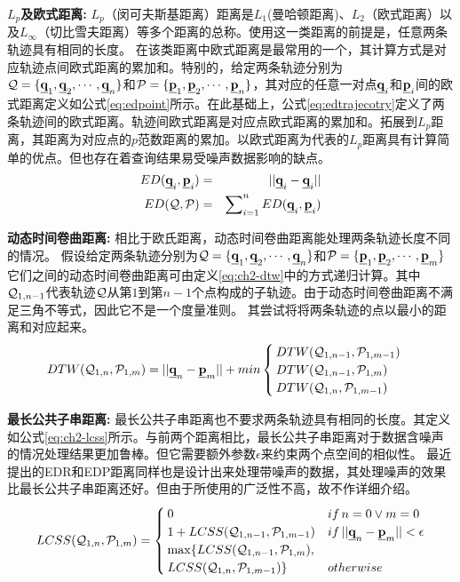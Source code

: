 \textbf{$L_{p}$及欧式距离:}
$L_{p}$（闵可夫斯基距离）距离是$L_1$(曼哈顿距离)、$L_2$（欧式距离）以及$L_\infty$（切比雪夫距离）等多个距离的总称。使用这一类距离的前提是，任意两条轨迹具有相同的长度。
在该类距离中欧式距离是最常用的一个，其计算方式是对应轨迹点间欧式距离的累加和。特别的，给定两条轨迹分别为${\cal{Q}}=\{\emph{{\textbf{q}}}_{1},\emph{{\textbf{q}}}_{2},\cdots,\emph{{\textbf{q}}}_{n}\}$和${\cal{P}}=\{\emph{{\textbf{p}}}_1,\emph{{\textbf{p}}}_{2},\cdots,\emph{{\textbf{p}}}_{n}\}$，其对应的任意一对点$\emph{{\textbf{q}}}_{i}$和$\emph{{\textbf{p}}}_{i}$间的欧式距离定义如公式\ref{eq:edpoint}所示。在此基础上，公式\ref{eq:edtrajecotry}定义了两条轨迹间的欧式距离。轨迹间欧式距离是对应点欧式距离的累加和。拓展到$L_{p}$距离，其距离为对应点的$p$范数距离的累加。以欧式距离为代表的$L_{p}$距离具有计算简单的优点。但也存在着查询结果易受噪声数据影响的缺点。
\begin{eqnarray}
ED(\emph{{\textbf{q}}}_{i},\emph{{\textbf{p}}}_{i})&=&||\emph{{\textbf{q}}}_{i} - \emph{{\textbf{q}}}_{i}|| \\ \label{eq:edpoint}
ED({\cal{Q}}, {\cal{P}})&=&\sum\nolimits_{i=1}^{n}ED(\emph{{\textbf{q}}}_{i},\emph{{\textbf{p}}}_{i}) \label{eq:edtrajecotry}
\end{eqnarray}


\textbf{动态时间卷曲距离:}
相比于欧氏距离，动态时间卷曲距离能处理两条轨迹长度不同的情况。
假设给定两条轨迹分别为${\cal{Q}}=\{\emph{{\textbf{q}}}_{1},\emph{{\textbf{q}}}_{2},\cdots,\emph{{\textbf{q}}}_{n}\}$和${\cal{P}}=\{\emph{{\textbf{p}}}_1,\emph{{\textbf{p}}}_{2},\cdots,\emph{{\textbf{p}}}_{m}\}$
它们之间的动态时间卷曲距离可由定义\ref{eq:ch2-dtw}中的方式递归计算。其中${\cal{Q}}_{1,n-1}$代表轨迹$\cal Q$从第$1$到第$n-1$个点构成的子轨迹。由于动态时间卷曲距离不满足三角不等式，因此它不是一个度量准则。
其尝试将将两条轨迹的点以最小的距离和对应起来。
\begin{equation}\label{eq:ch2-dtw}
DTW({\cal{Q}}_{1,n}, {\cal{P}}_{1,m})=||\emph{{\textbf{q}}}_{n}-\emph{{\textbf{p}}}_{m}||+min \begin{cases}
DTW({\cal{Q}}_{1,n-1}, {\cal{P}}_{1,m-1})  \\
DTW({\cal{Q}}_{1,n-1}, {\cal{P}}_{1,m})  \\
DTW({\cal{Q}}_{1,n}, {\cal{P}}_{1,m-1})
\end{cases}
\end{equation}


\textbf{最长公共子串距离:}
最长公共子串距离也不要求两条轨迹具有相同的长度。其定义如公式\ref{eq:ch2-lcss}所示。与前两个距离相比，最长公共子串距离对于数据含噪声的情况处理结果更加鲁棒。但它需要额外参数$\epsilon$来约束两个点空间的相似性。
最近提出的EDR和EDP距离同样也是设计出来处理带噪声的数据，其处理噪声的效果比最长公共子串距离还好。但由于所使用的广泛性不高，故不作详细介绍。
\begin{eqnarray}\label{eq:ch2-lcss}
LCSS({\cal{Q}}_{1,n}, {\cal{P}}_{1,m})= \begin{cases}
0 & if \, n=0 \lor m=0  \\
1+ LCSS({\cal{Q}}_{1,n-1}, {\cal{P}}_{1,m-1}) & if \,  ||\emph{{\textbf{q}}}_{n}-\emph{{\textbf{p}}}_{m}||<\epsilon  \\
\max \{LCSS({\cal{Q}}_{1,n-1}, {\cal{P}}_{1,m}) ,\\LCSS({\cal{Q}}_{1,n}, {\cal{P}}_{1,m-1})\} & otherwise
\end{cases}
\end{eqnarray}



